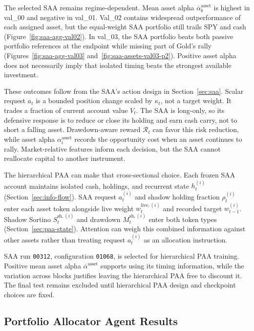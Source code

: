 The selected SAA remains regime-dependent. Mean asset alpha \(\overline\alpha_b^{\mathrm{asset}}\) is highest in val\_00 and negative in val\_01. Val\_02 contains widespread outperformance of each assigned asset, but the equal-weight SAA portfolio still trails SPY and cash (Figure~\ref{fig:saa-agg-val02}). In val\_03, the SAA portfolio beats both passive portfolio references at the endpoint while missing part of Gold's rally (Figures~\ref{fig:saa-agg-val03} and~\ref{fig:saa-assets-val03-p2}). Positive asset alpha does not necessarily imply that isolated timing beats the strongest available investment.

These outcomes follow from the SAA's action design in Section~\ref{sec:saa}. Scalar request \(a_t\) is a bounded position change scaled by \(\kappa_t\), not a target weight. It trades a fraction of current account value \(V_t\). The SAA is long-only, so its defensive response is to reduce or close its holding and earn cash carry, not to short a falling asset. Drawdown-aware reward \(\mathcal R_t\) can favor this risk reduction, while asset alpha \(\alpha_i^{\mathrm{asset}}\) records the opportunity cost when an asset continues to rally. Market-relative features inform each decision, but the SAA cannot reallocate capital to another instrument.

The hierarchical PAA can make that cross-sectional choice. Each frozen SAA account maintains isolated cash, holdings, and recurrent state \(h_t^{(i)}\) (Section~\ref{sec:info-flow}). SAA request \(a_t^{(i)}\) and shadow holding fraction \(\rho_t^{(i)}\) enter each asset token alongside live weight \(w_t^{\mathrm{live},(i)}\) and recorded target \(w_{t-1}^{(i)}\). Shadow Sortino \(S_t^{\mathrm{sh},(i)}\) and drawdown \(M_t^{\mathrm{sh},(i)}\) enter both token types (Section~\ref{sec:paa-state}). Attention can weigh this combined information against other assets rather than treating request \(a_t^{(i)}\) as an allocation instruction.

SAA run \texttt{00312}, configuration \texttt{01068}, is selected for hierarchical PAA training. Positive mean asset alpha \(\overline\alpha^{\mathrm{asset}}\) supports using its timing information, while the variation across blocks justifies leaving the hierarchical PAA free to discount it. The final test remains excluded until hierarchical PAA design and checkpoint choices are fixed.


\subsection{Portfolio Allocator Agent Results}
\label{sec:paa-results}

